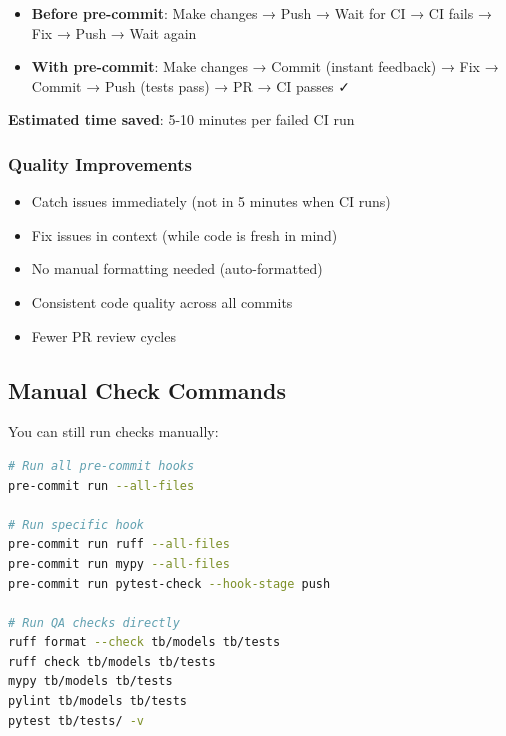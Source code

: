 \begin{record}

\begin{itemize}
\tightlist
\item
  \textbf{Before pre-commit}: Make changes → Push → Wait for CI → CI
  fails → Fix → Push → Wait again
\item
  \textbf{With pre-commit}: Make changes → Commit (instant feedback) →
  Fix → Commit → Push (tests pass) → PR → CI passes ✓
\end{itemize}

\textbf{Estimated time saved}: 5-10 minutes per failed CI run

\end{record}

\subsubsection{Quality Improvements}\label{cr:app:archive-pre-commit-setup-summary:quality-improvements}

\begin{record}

\begin{itemize}
\tightlist
\item
  \ok{} Catch issues immediately (not in 5 minutes when CI runs)
\item
  \ok{} Fix issues in context (while code is fresh in mind)
\item
  \ok{} No manual formatting needed (auto-formatted)
\item
  \ok{} Consistent code quality across all commits
\item
  \ok{} Fewer PR review cycles
\end{itemize}

\end{record}

\subsection{Manual Check Commands}\label{cr:app:archive-pre-commit-setup-summary:manual-check-commands}

\begin{record}

You can still run checks manually:

\begin{lstlisting}[language=bash]
# Run all pre-commit hooks
pre-commit run --all-files

# Run specific hook
pre-commit run ruff --all-files
pre-commit run mypy --all-files
pre-commit run pytest-check --hook-stage push

# Run QA checks directly
ruff format --check tb/models tb/tests
ruff check tb/models tb/tests
mypy tb/models tb/tests
pylint tb/models tb/tests
pytest tb/tests/ -v
\end{lstlisting}

\end{record}

